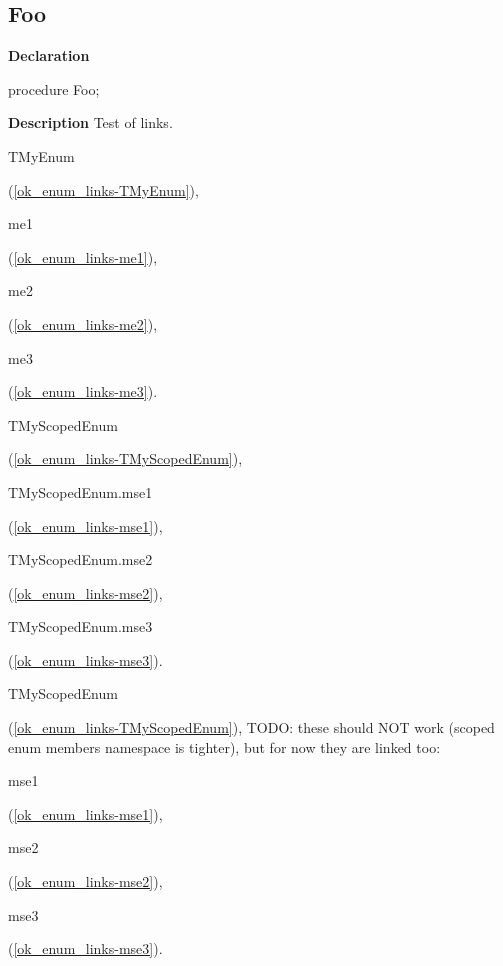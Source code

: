 \documentclass{report}
\newif\ifpdf
\begin{document}
\subsection*{Foo}
\fi
\label{ok_enum_links-Foo}
\begin{list}{}{
\setlength{\itemindent}{0cm}
\setlength{\listparindent}{0cm}
\setlength{\leftmargin}{\evensidemargin}
\addtolength{\leftmargin}{\tmplength}
\settowidth{\labelsep}{X}
\addtolength{\leftmargin}{\labelsep}
\setlength{\labelwidth}{\tmplength}
}
\item[\textbf{Declaration}\hfill]
\ifpdf
\begin{flushleft}
\fi
\begin{ttfamily}
procedure Foo;\end{ttfamily}

\ifpdf
\end{flushleft}
\fi

\par
\item[\textbf{Description}]
Test of links.

\begin{ttfamily}TMyEnum\end{ttfamily}(\ref{ok_enum_links-TMyEnum}), \begin{ttfamily}me1\end{ttfamily}(\ref{ok_enum_links-me1}), \begin{ttfamily}me2\end{ttfamily}(\ref{ok_enum_links-me2}), \begin{ttfamily}me3\end{ttfamily}(\ref{ok_enum_links-me3}).

\begin{ttfamily}TMyScopedEnum\end{ttfamily}(\ref{ok_enum_links-TMyScopedEnum}), \begin{ttfamily}TMyScopedEnum.mse1\end{ttfamily}(\ref{ok_enum_links-mse1}), \begin{ttfamily}TMyScopedEnum.mse2\end{ttfamily}(\ref{ok_enum_links-mse2}), \begin{ttfamily}TMyScopedEnum.mse3\end{ttfamily}(\ref{ok_enum_links-mse3}).

\begin{ttfamily}TMyScopedEnum\end{ttfamily}(\ref{ok_enum_links-TMyScopedEnum}), TODO: these should NOT work (scoped enum members namespace is tighter), but for now they are linked too: \begin{ttfamily}mse1\end{ttfamily}(\ref{ok_enum_links-mse1}), \begin{ttfamily}mse2\end{ttfamily}(\ref{ok_enum_links-mse2}), \begin{ttfamily}mse3\end{ttfamily}(\ref{ok_enum_links-mse3}).

\end{list}
\end{document}
